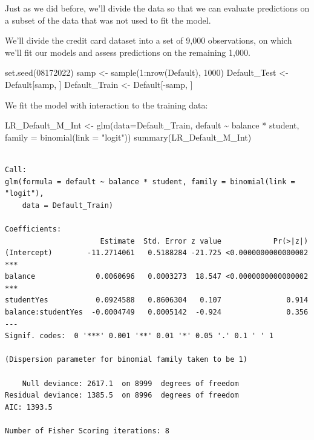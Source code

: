 \documentclass[
  letterpaper,
  DIV=11,
  numbers=noendperiod]{scrreprt}
\newenvironment{Shaded}{\begin{snugshade}}{\end{snugshade}}
\newcommand{\AttributeTok}[1]{\textcolor[rgb]{0.40,0.45,0.13}{#1}}
\newcommand{\DecValTok}[1]{\textcolor[rgb]{0.68,0.00,0.00}{#1}}
\newcommand{\FunctionTok}[1]{\textcolor[rgb]{0.28,0.35,0.67}{#1}}
\newcommand{\NormalTok}[1]{\textcolor[rgb]{0.00,0.23,0.31}{#1}}
\newcommand{\OtherTok}[1]{\textcolor[rgb]{0.00,0.23,0.31}{#1}}
\newcommand{\SpecialCharTok}[1]{\textcolor[rgb]{0.37,0.37,0.37}{#1}}
\newcommand{\StringTok}[1]{\textcolor[rgb]{0.13,0.47,0.30}{#1}}
\begin{document}
Just as we did before, we'll divide the data so that we can evaluate
predictions on a subset of the data that was not used to fit the model.

We'll divide the credit card dataset into a set of 9,000 observations,
on which we'll fit our models and assess predictions on the remaining
1,000.

\begin{Shaded}
\begin{Highlighting}[]
\FunctionTok{set.seed}\NormalTok{(}\DecValTok{08172022}\NormalTok{)}
\NormalTok{samp }\OtherTok{\textless{}{-}} \FunctionTok{sample}\NormalTok{(}\DecValTok{1}\SpecialCharTok{:}\FunctionTok{nrow}\NormalTok{(Default), }\DecValTok{1000}\NormalTok{)}
\NormalTok{Default\_Test }\OtherTok{\textless{}{-}}\NormalTok{ Default[samp, ]}
\NormalTok{Default\_Train }\OtherTok{\textless{}{-}}\NormalTok{ Default[}\SpecialCharTok{{-}}\NormalTok{samp, ]}
\end{Highlighting}
\end{Shaded}

We fit the model with interaction to the training data:

\begin{Shaded}
\begin{Highlighting}[]
\NormalTok{LR\_Default\_M\_Int }\OtherTok{\textless{}{-}} \FunctionTok{glm}\NormalTok{(}\AttributeTok{data=}\NormalTok{Default\_Train, default }\SpecialCharTok{\textasciitilde{}}\NormalTok{ balance }\SpecialCharTok{*}\NormalTok{ student, }\AttributeTok{family =} \FunctionTok{binomial}\NormalTok{(}\AttributeTok{link =} \StringTok{"logit"}\NormalTok{))}
\FunctionTok{summary}\NormalTok{(LR\_Default\_M\_Int)}
\end{Highlighting}
\end{Shaded}

\begin{verbatim}

Call:
glm(formula = default ~ balance * student, family = binomial(link = "logit"), 
    data = Default_Train)

Coefficients:
                      Estimate  Std. Error z value            Pr(>|z|)    
(Intercept)        -11.2714061   0.5188284 -21.725 <0.0000000000000002 ***
balance              0.0060696   0.0003273  18.547 <0.0000000000000002 ***
studentYes           0.0924588   0.8606304   0.107               0.914    
balance:studentYes  -0.0004749   0.0005142  -0.924               0.356    
---
Signif. codes:  0 '***' 0.001 '**' 0.01 '*' 0.05 '.' 0.1 ' ' 1

(Dispersion parameter for binomial family taken to be 1)

    Null deviance: 2617.1  on 8999  degrees of freedom
Residual deviance: 1385.5  on 8996  degrees of freedom
AIC: 1393.5

Number of Fisher Scoring iterations: 8
\end{verbatim}
\end{document}

